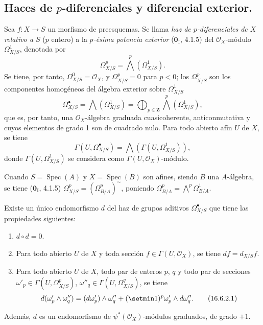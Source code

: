 \subsection{Haces de $p$-diferenciales y diferencial exterior.}
\label{IV.16.6}

\begin{env}[16.6.1]
\label{IV.16.6.1}
Sea $f:X\to S$ un morfismo de preesquemas. Se llama \emph{haz de
$p$-diferenciales de $X$ relativo a $S$} ($p$ entero) a la
\emph{$p$-ésima potencia exterior} ($\mathbf{0}_{\mathrm I}$, 4.1.5) del $\mathcal{O}_X$-módulo
$\varOmega_{X/S}^1$, denotada por
\[
  \varOmega_{X/S}^p=\bigwedge^p(\varOmega_{X/S}^1).
  \tag{16.6.1.1}
  \label{IV.16.6.1.1}
\]
Se tiene, por tanto, $\varOmega_{X/S}^0=\mathcal{O}_X$, y $\varOmega_{X/S}^p=0$ para $p<0$;
los $\varOmega_{X/S}^p$ son los componentes homogéneos del álgebra exterior
sobre $\varOmega_{X/S}^1$
\[
  \varOmega_{X/S}^{\bullet}=\bigwedge(\varOmega_{X/S}^1)
  =\bigoplus_{p\in\mathbf{Z}}\bigwedge^p(\varOmega_{X/S}^1),
  \tag{16.6.1.2}
  \label{IV.16.6.1.2}
\]
que es, por tanto, una $\mathcal{O}_X$-álgebra graduada cuasicoherente,
anticonmutativa y cuyos elementos de grado 1 son de cuadrado nulo. Para todo
abierto afín $U$ de $X$, se tiene
\[
  \Gamma(U,\varOmega_{X/S}^{\bullet})
  =\bigwedge(\Gamma(U,\varOmega_{X/S}^1)),
\]
donde $\Gamma(U,\varOmega_{X/S}^1)$ se considera como
$\Gamma(U,\mathcal{O}_X)$-módulo.

Cuando $S=\operatorname{Spec}(A)$ y $X=\operatorname{Spec}(B)$ son
afines, siendo $B$ una $A$-álgebra, se tiene ($\mathbf{0}_{\mathrm I}$, 4.1.5)
$\varOmega_{X/S}^p=(\Omega_{B/A}^p)^{\sim}$, poniendo
$\Omega_{B/A}^p=\bigwedge^p\Omega_{B/A}^1$.
\end{env}

\begin{theorem}[16.6.2]
\label{IV.16.6.2}
Existe un único endomorfismo $d$ del haz de grupos aditivos
$\varOmega_{X/S}^{\bullet}$ que tiene las propiedades siguientes:
\begin{enumerate}
\item[\textup{(i)}] $d\circ d=0$.
\item[\textup{(ii)}] Para todo abierto $U$ de $X$ y toda sección
$f\in\Gamma(U,\mathcal{O}_X)$, se tiene $df=d_{X/S}f$.
\item[\textup{(iii)}] Para todo abierto $U$ de $X$, todo par de enteros $p$, $q$ y
todo par de secciones
$\omega'_p\in\Gamma(U,\varOmega_{X/S}^p)$,
$\omega''_q\in\Gamma(U,\varOmega_{X/S}^q)$, se tiene
\[
  d(\omega'_p\wedge\omega''_q)
  =(d\omega'_p)\wedge\omega''_q
  +(\setmin 1)^p\omega'_p\wedge d\omega''_q.
  \tag{16.6.2.1}
  \label{IV.16.6.2.1}
\]
\end{enumerate}
Además, $d$ es un endomorfismo de $\psi^*(\mathcal{O}_X)$-módulos
graduados, de grado $+1$.
\end{theorem}

